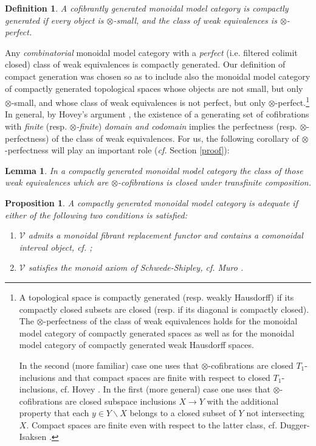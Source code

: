 \documentclass[10pt]{amsart}
\theoremstyle{plain}
\newtheorem{dfn}[subsection]{Definition}
\newtheorem{prp}[subsection]{Proposition}
\newtheorem{lma}[subsection]{Lemma}
\theoremstyle{remark}
\def\Vv{\mathcal{V}}
\begin{document}
\begin{dfn}\label{basics}A cofibrantly generated monoidal model category is \emph{compactly generated} if every object is $\otimes$-small, and the class of weak equivalences is $\otimes$-perfect.\end{dfn}

\noindent Any \emph{combinatorial} monoidal model category with a \emph{perfect} (i.e. filtered colimit closed) class of weak equivalences is compactly generated. Our definition of compact generation was chosen so as to include also the monoidal model category of compactly generated topological spaces whose objects are not small, but only $\otimes$-small, and whose class of weak equivalences is not perfect, but only $\otimes$-perfect.\footnote{A topological space is compactly generated (resp. weakly Hausdorff) if its compactly closed \cite[2.4.21(2)]{Ho} subsets are closed (resp. if its diagonal is compactly closed). The $\otimes$-perfectness of the class of weak equivalences holds for the monoidal model category of compactly generated spaces as well as for the monoidal model category of compactly generated weak Hausdorff spaces.

In the second (more familiar) case one uses that $\otimes$-cofibrations are closed $T_1$-inclusions and that compact spaces are finite with respect to closed $T_1$-inclusions, cf. Hovey \cite[2.4.1--5]{Ho}. In the first (more general) case one uses that $\otimes$-cofibrations are closed subspace inclusions $X\to Y$ with the additional property that each $y\in Y\backslash X$ belongs to a closed subset of $Y$ not intersecting $X$. Compact spaces are finite even with respect to the latter class, cf. Dugger-Isaksen \cite[A.3]{DI}.} In general, by Hovey's argument \cite[7.4.2]{Ho}, the existence of a generating set of cofibrations with \emph{finite} (resp. \emph{$\otimes$-finite}) \emph{domain and codomain} implies the perfectness (resp. $\otimes$-perfectness) of the class of weak equivalences. For us, the following corollary of $\otimes$-perfectness will play an important role (\emph{cf.} Section \ref{proof}):

\begin{lma}\label{transfinite}In a compactly generated monoidal model category the class of those weak equivalences which are $\otimes$-cofibrations is closed under transfinite composition.\end{lma}

\begin{prp}\label{adequate2}A compactly generated monoidal model category is \emph{adequate} if either of the following two conditions is satisfied:

\begin{enumerate}\item[(i)]$\Vv$ admits a monoidal fibrant replacement functor and contains a comonoidal interval object, cf. \cite{BM2};
\item[(ii)]$\Vv$ satisfies the monoid axiom of Schwede-Shipley, cf. Muro \cite{Mu}.\end{enumerate}\end{prp}
\end{document}
